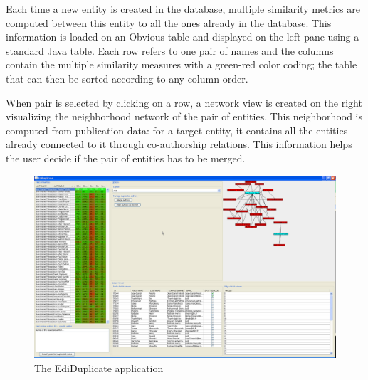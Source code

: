 Each time a new entity is created in the database, multiple similarity
metrics are computed between this entity to all the ones already in
the database.  This information is loaded on an Obvious table and
displayed on the left pane using a standard Java table.  Each row
refers to one pair of names and the columns contain the multiple
similarity measures with a green-red color coding; the table that can
then be sorted according to any column order.

When pair is selected by clicking on a row, a network view is created
on the right visualizing the neighborhood network of the pair of
entities.  This neighborhood is computed from publication data: for a
target entity, it contains all the entities already connected to it
through co-authorship relations.  This information helps the user
decide if the pair of entities has to be merged.

\begin{figure}[!h]
\includegraphics[width=\columnwidth]{figures/ediduplicate}
\caption{The EdiDuplicate application}
\label{fig:ediduplicate}
\end{figure}

